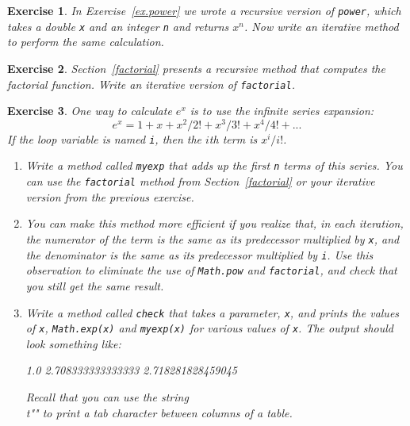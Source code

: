 \documentclass[12pt]{book}
\theoremstyle{exercise}
\newtheorem{exercise}{Exercise}[chapter]
\newcommand{\java}[1]{\verb"#1"}
\newcommand{\java}[1]{\lstinline{#1}} %
\begin{document}
\begin{exercise}

In Exercise~\ref{ex.power} we wrote a recursive version of \java{power}, which takes a double \java{x} and an integer \java{n} and returns $x^n$.
Now write an iterative method to perform the same calculation.

\end{exercise}


\begin{exercise}

Section~\ref{factorial} presents a recursive method that computes the factorial function.
Write an iterative version of \java{factorial}.

\end{exercise}


\begin{exercise}

One way to calculate $e^x$ is to use the infinite series expansion:
%
\[ e^x = 1 + x + x^2 / 2! + x^3 / 3! + x^4 / 4! + ... \]
%
If the loop variable is named \java{i}, then the $i$th term is $x^i / i!$.

\begin{enumerate}

\item Write a method called \java{myexp} that adds up the first \java{n} terms of this series.
You can use the \java{factorial} method from Section~\ref{factorial} or your iterative version from the previous exercise.

\item You can make this method more efficient if you realize that, in each iteration, the numerator of the term is the same as its predecessor multiplied by \java{x}, and the denominator is the same as its predecessor multiplied by \java{i}.
Use this observation to eliminate the use of \java{Math.pow} and \java{factorial}, and check that you still get the same result.

\item Write a method called \java{check} that takes a parameter, \java{x}, and prints the values of \java{x}, \java{Math.exp(x)} and \java{myexp(x)} for various values of \java{x}.
The output should look something like:

\begin{stdout}
1.0     2.708333333333333     2.718281828459045
\end{stdout}

Recall that you can use the string \java{"\\t"} to print a tab character between columns of a table.


\end{enumerate}
\end{exercise}
\end{document}

